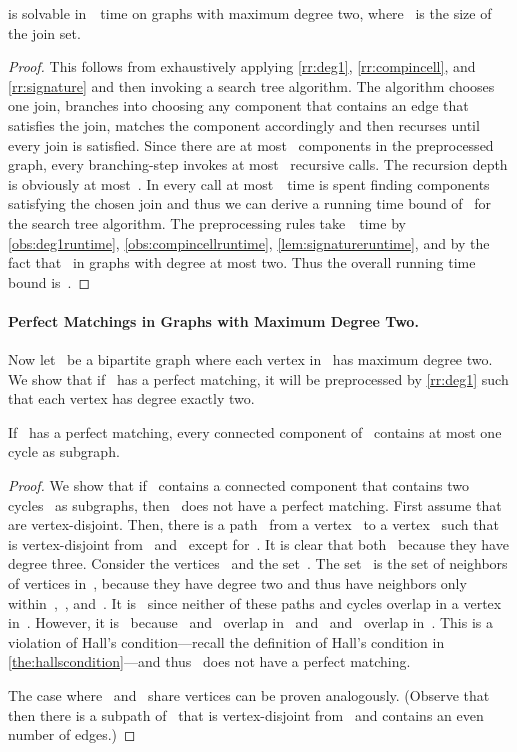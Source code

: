 \begin{lemma}\label{lem:cbmmaxdeg2tractable}
  \pCBMs{} is solvable in~~time on graphs with maximum degree two, where~ is the size of the join set.
\end{lemma}
\begin{proof}
  This follows from exhaustively applying \autoref{rr:deg1}, \autoref{rr:compincell}, and \autoref{rr:signature} and then invoking a search tree algorithm. The algorithm chooses one join, branches into choosing any component that contains an edge that satisfies the join, matches the component accordingly and then recurses until every join is satisfied. Since there are at most~ components in the preprocessed graph, every branching-step invokes at most~ recursive calls. The recursion depth is obviously at most~. In every call at most~~time is spent finding components satisfying the chosen join and thus we can derive a running time bound of~ for the search tree algorithm. The preprocessing rules take~~time by \autoref{obs:deg1runtime}, \autoref{obs:compincellruntime}, \autoref{lem:signatureruntime}, and by the fact that~ in graphs with degree at most two. Thus the overall running time bound is~.
\end{proof}
\paragraph{Perfect Matchings in Graphs with Maximum Degree Two.} Now let~ be a bipartite graph where each vertex in~ has maximum degree two. We show that if~ has a perfect matching, it will be preprocessed by \autoref{rr:deg1} such that each vertex has degree exactly two.
\begin{lemma}\label{lem:perfmatchatmostonecycle}
  If~ has a perfect matching, every connected component of~ contains at most one cycle as subgraph.
\end{lemma}
\begin{proof}
  We show that if~ contains a connected component that contains two cycles~ as subgraphs, then~ does not have a perfect matching. First assume that~ are vertex-disjoint. Then, there is a path~ from a vertex~ to a vertex~ such that~ is vertex-disjoint from~ and~ except for~. It is clear that both~ because they have degree three. Consider the vertices~ and the set~. The set~ is the set of neighbors of vertices in~, because they have degree two and thus have neighbors only within~,~, and~. It is~ since neither of these paths and cycles overlap in a vertex in~. However, it is~ because~ and~ overlap in~ and~ and~ overlap in~. This is a violation of Hall's condition---recall the definition of Hall's condition in \autoref{the:hallscondition}---and thus~ does not have a perfect matching.

  The case where~ and~ share vertices can be proven analogously. (Observe that then there is a subpath of~ that is vertex-disjoint from~ and contains an even number of edges.)
\end{proof}

